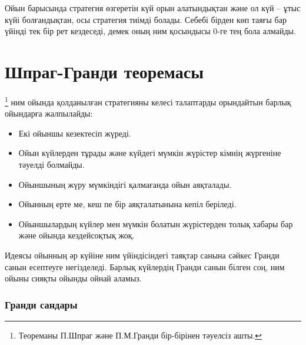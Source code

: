 Ойын барысында стратегия өзгеретін күй орын алатындықтан және
ол күй -- ұтыс күйі болғандықтан, осы стратегия тиімді болады. Себебі бірден көп таяғы бар үйінді тек бір рет кездеседі,
демек оның ним қосындысы 0-ге тең бола алмайды. 


\section{Шпраг-Гранди теоремасы}


\footnote{Теореманы П.Шпраг \cite{spr35} және П.М.Гранди \cite{gru39} бір-бірінен тәуелсіз ашты.} ним ойында қолданылған 
стратегияны келесі талаптарды орындайтын барлық ойындарға жалпылайды:


\begin{itemize}[noitemsep]
\item Екі ойыншы кезектесіп жүреді.
\item Ойын күйлерден тұрады және күйдегі мүмкін жүрістер кімнің жүргеніне тәуелді болмайды.
\item Ойыншының жүру мүмкіндігі қалмағанда ойын аяқталады.
\item Ойынның ерте ме, кеш пе бір аяқталатынына кепіл беріледі.
\item Ойыншылардың күйлер мен мүмкін болатын жүрістерден толық хабары бар
және ойында кездейсоқтық жоқ. 
\end{itemize}
Идеясы ойынның әр күйіне ним 
үйіндісіндегі таяқтар санына сәйкес Гранди санын есептеуге негізделеді.
Барлық күйлердің Гранди санын білген соң, ним ойыны 
сияқты ойынды ойнай аламыз. 


\subsubsection{Гранди сандары}

